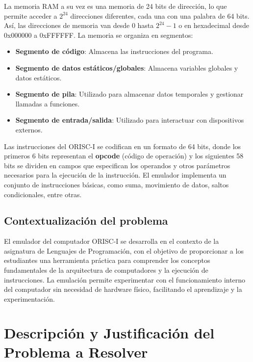 \documentclass{article}
\begin{document}
La memoria RAM a su vez es una memoria de 24 bits de dirección, lo que permite acceder a $2^{24}$ direcciones diferentes, cada una con una palabra de 64 bits. Así, las direcciones de memoria van desde 0 hasta $2^{24}-1$ o en hexadecimal desde 0x000000 a 0xFFFFFF. La memoria se organiza en segmentos:
\begin{itemize}
  \item \textbf{Segmento de código}: Almacena las instrucciones del programa.
  \item \textbf{Segmento de datos estáticos/globales}: Almacena variables globales y datos estáticos.
  \item \textbf{Segmento de pila}: Utilizado para almacenar datos temporales y gestionar llamadas a funciones.
  \item \textbf{Segmento de entrada/salida}: Utilizado para interactuar con dispositivos externos.
\end{itemize}

Las instrucciones del ORISC-I se codifican en un formato de 64 bits, donde los primeros 6 bits representan el \textbf{opcode} (código de operación) y los siguientes 58 bits se dividen en campos que especifican los operandos y otros parámetros necesarios para la ejecución de la instrucción. El emulador implementa un conjunto de instrucciones básicas, como suma, movimiento de datos, saltos condicionales, entre otras.

\subsection{Contextualización del problema}

El emulador del computador ORISC-I se desarrolla en el contexto de la asignatura de Lenguajes de Programación, con el objetivo de proporcionar a los estudiantes una herramienta práctica para comprender los conceptos fundamentales de la arquitectura de computadores y la ejecución de instrucciones. La emulación permite experimentar con el funcionamiento interno del computador sin necesidad de hardware físico, facilitando el aprendizaje y la experimentación.


\section{Descripción y Justificación del Problema a Resolver}\label{sec:descr}
\end{document}
